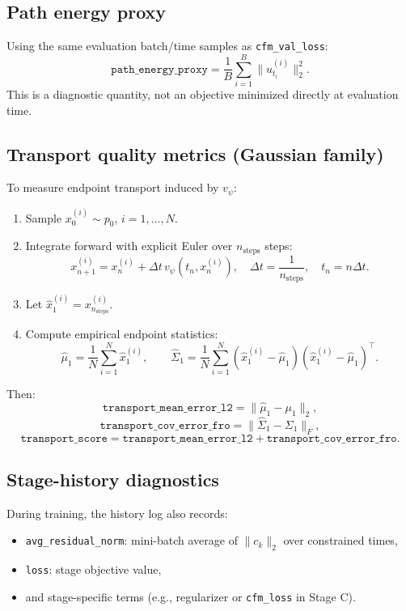 \documentclass[11pt]{article}
\begin{document}
\subsection*{Path energy proxy}
Using the same evaluation batch/time samples as \texttt{cfm\_val\_loss}:
\[
\texttt{path\_energy\_proxy}
=
\frac{1}{B}\sum_{i=1}^B \|u_{t_i}^{(i)}\|_2^2.
\]
This is a diagnostic quantity, not an objective minimized directly at evaluation time.

\subsection*{Transport quality metrics (Gaussian family)}
To measure endpoint transport induced by $v_\psi$:
\begin{enumerate}
    \item Sample $x_0^{(i)} \sim p_0$, $i=1,\dots,N$.
    \item Integrate forward with explicit Euler over $n_{\text{steps}}$ steps:
    \[
    x^{(i)}_{n+1}
    =
    x^{(i)}_{n}
    +
    \Delta t\, v_\psi(t_n, x^{(i)}_n),
    \quad
    \Delta t = \frac{1}{n_{\text{steps}}},
    \quad
    t_n = n\Delta t.
    \]
    \item Let $\hat{x}_1^{(i)} = x^{(i)}_{n_{\text{steps}}}$.
    \item Compute empirical endpoint statistics:
    \[
    \hat{\mu}_1 = \frac{1}{N}\sum_{i=1}^N \hat{x}_1^{(i)},
    \qquad
    \hat{\Sigma}_1=\frac{1}{N}\sum_{i=1}^N
    (\hat{x}_1^{(i)}-\hat{\mu}_1)(\hat{x}_1^{(i)}-\hat{\mu}_1)^\top.
    \]
\end{enumerate}
Then:
\[
\texttt{transport\_mean\_error\_l2}
=
\|\hat{\mu}_1-\mu_1\|_2,
\]
\[
\texttt{transport\_cov\_error\_fro}
=
\|\hat{\Sigma}_1-\Sigma_1\|_F,
\]
\[
\texttt{transport\_score}
=
\texttt{transport\_mean\_error\_l2}
+
\texttt{transport\_cov\_error\_fro}.
\]

\subsection*{Stage-history diagnostics}
During training, the history log also records:
\begin{itemize}
    \item \texttt{avg\_residual\_norm}: mini-batch average of $\|c_k\|_2$ over constrained times,
    \item \texttt{loss}: stage objective value,
    \item and stage-specific terms (e.g., regularizer or \texttt{cfm\_loss} in Stage C).
\end{itemize}
\end{document}

